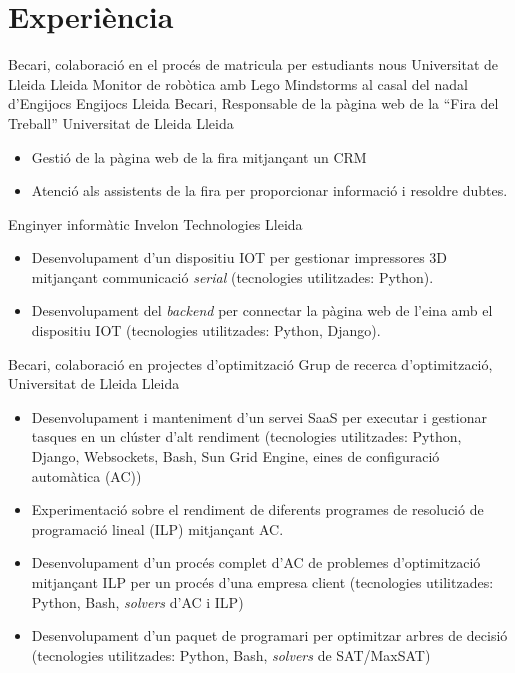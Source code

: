 \documentclass[a4paper,12pt,final]{moderncv}
\begin{document}
\section{Experiència}
	{Becari, colaboració en el procés de matricula per estudiants nous}
	{Universitat de Lleida}
	{Lleida}
	{}
	{}
	{Monitor de robòtica amb Lego Mindstorms al casal del nadal d'Engijocs}
	{Engijocs}
	{Lleida}
	{}
	{}
	{Becari, Responsable de la pàgina web de la ``Fira del Treball''}
	{Universitat de Lleida}
	{Lleida}
	{}
	{\begin{itemize}
		\item Gestió de la pàgina web de la fira mitjançant un CRM
		\item Atenció als assistents de la fira per proporcionar informació i resoldre dubtes.
	\end{itemize}}
	{Enginyer informàtic}
	{Invelon Technologies}
	{Lleida}
	{}
	{\begin{itemize}
		\item Desenvolupament d'un dispositiu IOT per gestionar impressores 3D
			mitjançant communicació \textit{serial} (tecnologies utilitzades: Python).
		\item Desenvolupament del \textit{backend} per connectar la pàgina web
			de l'eina amb el dispositiu IOT (tecnologies utilitzades: Python, Django).
	\end{itemize}}
	{Becari, colaboració en projectes d'optimització}
	{Grup de recerca d'optimització, Universitat de Lleida}
	{Lleida}
	{}
	{\begin{itemize}
		\item Desenvolupament i manteniment d'un servei SaaS per executar i
			gestionar tasques en un clúster d'alt rendiment (tecnologies
			utilitzades: Python, Django, Websockets, Bash, Sun Grid Engine,
			eines de configuració automàtica (AC))
		\item Experimentació sobre el rendiment de diferents programes de
			resolució de programació lineal (ILP) mitjançant AC.
		\item Desenvolupament d'un procés complet d'AC de problemes
			d'optimització mitjançant ILP per un procés d'una empresa client
			(tecnologies utilitzades: Python, Bash, \textit{solvers} d'AC i 
			ILP)
		\item Desenvolupament d'un paquet de programari per optimitzar
			arbres de decisió (tecnologies utilitzades: Python, Bash,
			\textit{solvers} de SAT/MaxSAT)
	\end{itemize}}
\end{document}
